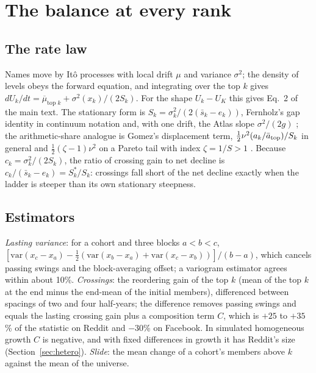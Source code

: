 \documentclass[10pt]{article}
\begin{document}
\section{The balance at every rank}\label{sec:boundary}
\subsection{The rate law}
Names move by Itô processes with local drift $\mu$ and variance $\sigma^2$; the density of levels obeys the forward equation, and integrating over the top $k$ gives $dU_k/dt = \overline{\mu}_{\text{top }k} + \sigma^2(x_k)/(2S_k)$. For the shape $U_k-U_K$ this gives Eq.~2 of the main text. The stationary form is $S_k = \sigma_k^2/(2(\bar s_k - e_k))$, Fernholz's gap identity in continuum notation and, with one drift, the Atlas slope $\sigma^2/(2g)$ \cite{fernholz2002,fernholz2017,fernholzfernholz2020}; the arithmetic-share analogue is Gomez's displacement term, $\tfrac12\nu^2(a_k/\bar a_{\rm top})/S_k$ in general and $\tfrac12(\zeta-1)\nu^2$ on a Pareto tail with index $\zeta = 1/S > 1$ \cite{gomez2023}. Because $c_k = \sigma_k^2/(2S_k)$, the ratio of crossing gain to net decline is $c_k/(\bar s_k - e_k) = S^\ast_k/S_k$: crossings fall short of the net decline exactly when the ladder is steeper than its own stationary steepness.
\subsection{Estimators}
\emph{Lasting variance}: for a cohort and three blocks $a<b<c$, $[\mathrm{var}(x_c-x_a) - \tfrac12(\mathrm{var}(x_b-x_a)+\mathrm{var}(x_c-x_b))]/(b-a)$, which cancels passing swings and the block-averaging offset; a variogram estimator agrees within about 10\%. \emph{Crossings}: the reordering gain of the top $k$ (mean of the top $k$ at the end minus the end-mean of the initial members), differenced between spacings of two and four half-years; the difference removes passing swings and equals the lasting crossing gain plus a composition term $C$, which is $+25$ to $+35$\% of the statistic on Reddit and $-30$\% on Facebook. In simulated homogeneous growth $C$ is negative, and with fixed differences in growth it has Reddit's size (Section~\ref{sec:hetero}). \emph{Slide}: the mean change of a cohort's members above $k$ against the mean of the universe.
\end{document}
